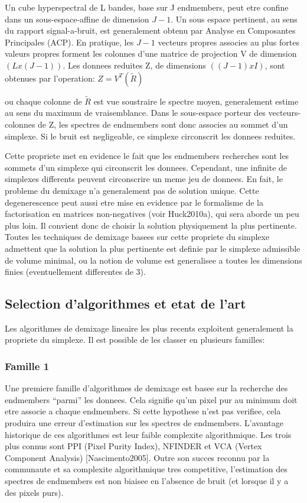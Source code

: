 Un cube hyperspectral de L bandes, base sur J endmembers,
peut etre confine dans un sous-espace-affine de dimension $J-1$.  
Un sous espace pertinent, au sens du rapport signal-a-bruit, est
generalement obtenu par Analyse en Composantes Principales (ACP). En
pratique, les $J-1$ vecteurs propres associes au plus fortes valeurs
propres forment les colonnes d'une matrice de projection V de
dimension $(Lx(J-1))$. Les donnees reduites Z, de dimensions
$((J-1)xI)$, sont obtenues par l'operation:
$Z=V^{T}(\tilde{R})$

ou chaque colonne de $\tilde{R}$ est vue soustraire le spectre moyen,
generalement estime au sens du maximum de vraisemblance. Dans le
sous-espace porteur des vecteurs-colonnes de Z, les spectres de
endmembers sont donc associes au sommet d'un simplexe. Si le bruit est
negligeable, ce simplexe circonscrit les donnees reduites.

Cette propriete met en evidence le fait que les endmembers
recherches sont les sommets d'un simplexe qui circonscrit les
donnees. Cependant, une infinite de simplexes differents peuvent
circonscrire un meme jeu de donnees. En fait, le probleme du demixage
n'a generalement pas de solution unique. Cette degenerescence peut
aussi etre mise en evidence par le formalisme de la factorisation en
matrices non-negatives (voir Huck2010a), qui sera aborde un peu plus
loin. Il convient donc de choisir la solution physiquement la plus
pertinente. Toutes les techniques de demixage basees sur cette
propriete du simplexe admettent que la solution la plus pertinente est
definie par le simplexe admissible de volume minimal, ou la notion de
volume est generalisee a toutes les dimensions finies (eventuellement
differentes de 3).  

\subsection{Selection d'algorithmes et etat de l'art} 
Les algorithmes de demixage lineaire les plus recents exploitent
generalement la propriete du simplexe. Il est possible de les classer
en plusieurs familles:
\subsubsection{Famille 1} 
Une premiere famille d'algorithmes
de demixage est basee sur la recherche des endmembers ``parmi'' les
donnees. Cela signifie qu'un pixel pur au minimum doit etre associe a
chaque endmembers. Si cette hypothese n'est pas verifiee, cela
produira une erreur d'estimation sur les spectres de
endmembers. L'avantage historique de ces algorithmes est leur faible
complexite algorithmique. Les trois plus connus sont PPI (Pixel Purity
Index), NFINDER et VCA (Vertex Component Analysis)
[Nascimento2005]. Outre son succes reconnu par la communaute et sa
complexite algorithmique tres competitive, l'estimation des spectres
de endmembers est non biaisee en l'absence de bruit (et lorsque il y a
des pixels purs).

